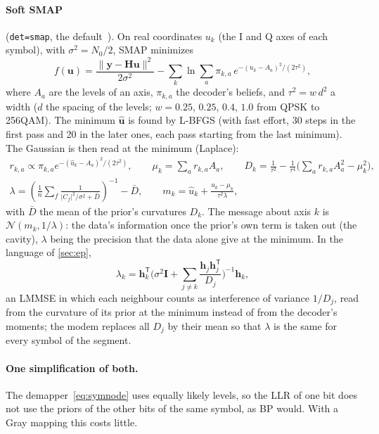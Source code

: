 \documentclass[11pt,a4paper]{article}
\newcommand{\code}[1]{\texttt{#1}}
\newcommand{\N}{\mathcal{N}}
\theoremstyle{definition}
\theoremstyle{remark}
\begin{document}
\paragraph{Soft SMAP} (\code{det=smap}, the default~\cite{smap}). On real coordinates $u_k$ (the I and Q axes of each symbol), with $\sigma^2=N_0/2$, SMAP minimizes
\begin{equation}
  f(\bm{u}) = \frac{\|\bm{y}-\bm{H}\bm{u}\|^2}{2\sigma^2} - \sum_k \ln\sum_a \pi_{k,a}\, e^{-(u_k-A_a)^2/(2\tau^2)},
\end{equation}
where $A_a$ are the levels of an axis, $\pi_{k,a}$ the decoder's beliefs, and $\tau^2 = w\,d^2$ a width ($d$ the spacing of the levels; $w = 0.25$, $0.25$, $0.4$, $1.0$ from QPSK to 256QAM). The minimum $\hat{\bm{u}}$ is found by L-BFGS (with fast effort, 30 steps in the first pass and 20 in the later ones, each pass starting from the last minimum). The Gaussian is then read at the minimum (Laplace):
\begin{gather}
  r_{k,a}\propto \pi_{k,a}e^{-(\hat u_k-A_a)^2/(2\tau^2)},\qquad \mu_k=\sum_a r_{k,a}A_a,\qquad D_k = \frac{1}{\tau^2}-\frac{1}{\tau^4}\Big(\sum_a r_{k,a}A_a^2-\mu_k^2\Big),\\
  \lambda = \left(\frac{1}{n}\sum_f \frac{1}{|C_f|^2/\sigma^2+\bar D}\right)^{-1} - \bar D,\qquad
  m_k = \hat u_k + \frac{\hat u_k-\mu_k}{\tau^2\lambda},
\end{gather}
with $\bar D$ the mean of the prior's curvatures $D_k$. The message about axis $k$ is $\N(m_k,1/\lambda)$: the data's information once the prior's own term is taken out (the cavity), $\lambda$ being the precision that the data alone give at the minimum. In the language of \cref{sec:ep},
\begin{equation}
  \lambda_k = \bm{h}_k^{\mathsf T}\Big(\sigma^2\bm{I} + \sum_{j\neq k}\frac{\bm{h}_j\bm{h}_j^{\mathsf T}}{D_j}\Big)^{-1}\bm{h}_k,
\end{equation}
an LMMSE in which each neighbour counts as interference of variance $1/D_j$, read from the curvature of its prior at the minimum instead of from the decoder's moments; the modem replaces all $D_j$ by their mean so that $\lambda$ is the same for every symbol of the segment.

\paragraph{One simplification of both.} The demapper~\eqref{eq:symnode} uses equally likely levels, so the LLR of one bit does not use the priors of the other bits of the same symbol, as BP would. With a Gray mapping this costs little.
\end{document}
